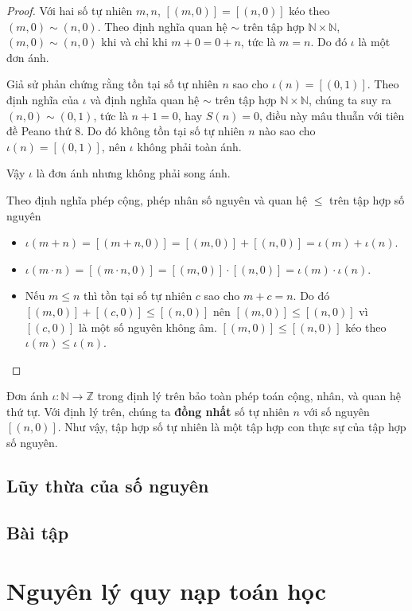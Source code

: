 \begin{proof}
    Với hai số tự nhiên $m, n$, $[(m, 0)] = [(n, 0)]$ kéo theo $(m, 0)\sim (n, 0)$. Theo định nghĩa quan hệ $\sim$ trên tập hợp $\mathbb{N}\times\mathbb{N}$, $(m, 0)\sim (n, 0)$ khi và chỉ khi $m + 0 = 0 + n$, tức là $m = n$. Do đó $\iota$ là một đơn ánh.

    Giả sử phản chứng rằng tồn tại số tự nhiên $n$ sao cho $\iota(n) = [(0, 1)]$. Theo định nghĩa của $\iota$ và định nghĩa quan hệ $\sim$ trên tập hợp $\mathbb{N}\times\mathbb{N}$, chúng ta suy ra $(n, 0)\sim (0, 1)$, tức là $n + 1 = 0$, hay $S(n) = 0$, điều này mâu thuẫn với tiên đề Peano thứ 8. Do đó không tồn tại số tự nhiên $n$ nào sao cho $\iota(n) = [(0, 1)]$, nên $\iota$ không phải toàn ánh.

    Vậy $\iota$ là đơn ánh nhưng không phải song ánh.

    Theo định nghĩa phép cộng, phép nhân số nguyên và quan hệ $\leq$ trên tập hợp số nguyên
    \begin{itemize}
        \item $\iota(m + n) = [(m + n, 0)] = [(m, 0)] + [(n, 0)] = \iota(m) + \iota(n)$.
        \item $\iota(m\cdot n) = [(m\cdot n, 0)] = [(m, 0)]\cdot [(n, 0)] = \iota(m)\cdot\iota(n)$.
        \item Nếu $m\leq n$ thì tồn tại số tự nhiên $c$ sao cho $m + c = n$. Do đó $[(m, 0)] + [(c, 0)]\leq [(n, 0)]$ nên $[(m, 0)]\leq [(n, 0)]$ vì $[(c, 0)]$ là một số nguyên không âm. $[(m, 0)]\leq [(n, 0)]$ kéo theo $\iota(m)\leq\iota(n)$.
    \end{itemize}
\end{proof}

Đơn ánh $\iota: \mathbb{N}\to \mathbb{Z}$ trong định lý trên bảo toàn phép toán cộng, nhân, và quan hệ thứ tự. Với định lý trên, chúng ta \textbf{đồng nhất} số tự nhiên $n$ với số nguyên $[(n, 0)]$. Như vậy, tập hợp số tự nhiên là một tập hợp con thực sự của tập hợp số nguyên.

\subsection{Lũy thừa của số nguyên}

\subsection{Bài tập}

\section{Nguyên lý quy nạp toán học}\label{section:principle-of-mathematical-induction}


